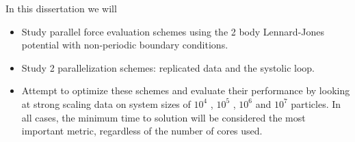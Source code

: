 %
In this dissertation we will
\begin{itemize}
\item
    Study parallel force evaluation schemes using
    the 2 body Lennard-Jones potential with
    non-periodic boundary conditions.

\item
    Study 2 parallelization schemes:
    replicated data and the systolic loop.

\item
    Attempt to optimize these schemes and
    evaluate their performance by looking at
    strong scaling data on system sizes of
    $10^4$ , $10^5$ , $10^6$ and $10^7$ particles.
    In all cases, the minimum time to solution will be
    considered the most important metric,
    regardless of the number of cores used.
\end  {itemize}
